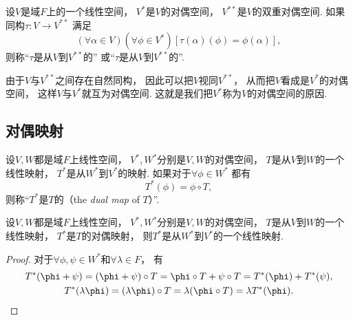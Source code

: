 \begin{definition}
设\(V\)是域\(F\)上的一个线性空间，
\(V^*\)是\(V\)的对偶空间，
\(V^{**}\)是\(V\)的双重对偶空间.
如果同构\(\tau\colon V \to V^{**}\)
满足\begin{equation*}
	(\forall \alpha \in V)
	(\forall \phi \in V^*)
	[
		\tau(\alpha)(\phi)
		= \phi(\alpha)
	],
\end{equation*}
则称“\(\tau\)是从\(V\)到\(V^{**}\)的”
或“\(\tau\)是从\(V\)到\(V^{**}\)的”.
\end{definition}

由于\(V\)与\(V^{**}\)之间存在自然同构，
因此可以把\(V\)视同\(V^{**}\)，
从而把\(V\)看成是\(V^*\)的对偶空间，
这样\(V\)与\(V^*\)就互为对偶空间.
这就是我们把\(V^*\)称为\(V\)的对偶空间的原因.

\subsection{对偶映射}
\begin{definition}
设\(V,W\)都是域\(F\)上线性空间，
\(V^*,W^*\)分别是\(V,W\)的对偶空间，
\(T\)是从\(V\)到\(W\)的一个线性映射，
\(T^*\)是从\(W^*\)到\(V^*\)的映射.
如果对于\(\forall \phi \in W^*\)
都有\begin{equation*}
	T^*(\phi) = \phi \circ T,
\end{equation*}
则称“\(T^*\)是\(T\)的（the \emph{dual map} of \(T\)）”.
\end{definition}

\begin{proposition}
设\(V,W\)都是域\(F\)上线性空间，
\(V^*,W^*\)分别是\(V,W\)的对偶空间，
\(T\)是从\(V\)到\(W\)的一个线性映射，
\(T^*\)是\(T\)的对偶映射，
则\(T^*\)是从\(W^*\)到\(V^*\)的一个线性映射.
\begin{proof}
对于\(\forall \phi,\psi \in W^*\)和\(\forall \lambda \in F\)，
有\begin{gather*}
	T^*(\phi+\psi)
	= (\phi+\psi) \circ T
	= \phi \circ T + \psi \circ T
	= T^*(\phi) + T^*(\psi), \\
	T^*(\lambda\phi)
	= (\lambda\phi) \circ T
	= \lambda (\phi \circ T)
	= \lambda T^*(\phi).
	\qedhere
\end{gather*}
\end{proof}
\end{proposition}

